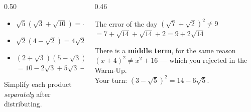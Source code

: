 \documentclass[aspectratio=169, 11pt]{beamer}
\begin{document}
\begin{frame}[t, plain]
  \begin{columns}[T]
    \begin{column}{0.50\textwidth}
      \footnotesize
      \begin{itemize}\setlength{\itemsep}{6pt}
        \item $\sqrt5\left(\sqrt3+\sqrt{10}\right)=\sqrt{15}+\sqrt{50}=\sqrt{15}+5\sqrt2$
        \item $\sqrt2\left(4-\sqrt2\right)=4\sqrt2-2$
        \item $\left(2+\sqrt3\right)\left(5-\sqrt3\right)$ \\[3pt]
              \qquad $=10-2\sqrt3+5\sqrt3-3=7+3\sqrt3$
      \end{itemize}
      \vspace{6pt}
      {\footnotesize Simplify each product \emph{separately} after distributing.}
    \end{column}
    \begin{column}{0.46\textwidth}
      \begin{block}{The error of the day}
        $\left(\sqrt7+\sqrt2\right)^{2} \ne 9$ \\[4pt]
        $=7+\sqrt{14}+\sqrt{14}+2 = 9+2\sqrt{14}$
      \end{block}
      \vspace{4pt}
      {\footnotesize There is a \textbf{middle term}, for the same reason
      \textcolor{keyred}{$(x+4)^{2}\ne x^{2}+16$} --- which you rejected in the Warm-Up. \\[5pt]
      Your turn: $\left(3-\sqrt5\right)^{2}=14-6\sqrt5$.}
    \end{column}
  \end{columns}
\end{frame}
\end{document}
